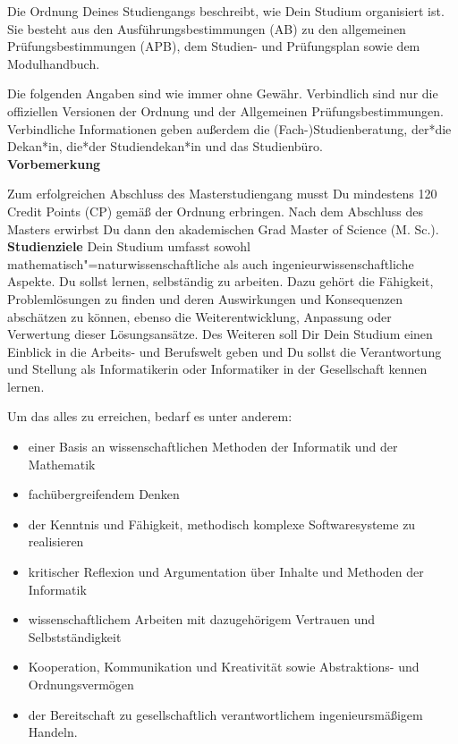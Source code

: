 {Die Ordnung Deines Studiengangs beschreibt, wie Dein Studium organisiert ist. Sie besteht aus den Ausführungsbestimmungen (AB) zu den allgemeinen Prüfungsbestimmungen (APB), dem Studien- und Prüfungsplan sowie dem Modulhandbuch.
}{
Die folgenden Angaben sind wie immer ohne Gewähr. Verbindlich sind nur die offiziellen Versionen der Ordnung und der Allgemeinen Prüfungsbestimmungen. Verbindliche Informationen geben außerdem die (Fach-)Studienberatung, der*die Dekan*in, die*der Studiendekan*in und das Studienbüro.\\

\noindent\textbf{Vorbemerkung}

Zum erfolgreichen Abschluss des Masterstudiengang musst Du mindestens 120 Credit Points (CP) gemäß der Ordnung erbringen. Nach dem Abschluss des Masters erwirbst Du dann den akademischen Grad Master of Science (M. Sc.).\\

\noindent\textbf{Studienziele}
Dein Studium umfasst sowohl mathematisch"=naturwissenschaftliche als auch ingenieurwissenschaftliche Aspekte. Du sollst lernen, selbständig zu arbeiten. Dazu gehört die Fähigkeit, Problemlösungen zu finden und deren Auswirkungen und Konsequenzen abschätzen zu können, ebenso die Weiterentwicklung, Anpassung oder Verwertung dieser Lösungsansätze. Des Weiteren soll Dir Dein Studium einen Einblick in die Arbeits- und Berufswelt geben und Du sollst die Verantwortung und Stellung als Informatikerin oder Informatiker in der Gesellschaft kennen lernen.

Um das alles zu erreichen, bedarf es unter anderem:
\begin{itemize}
\item einer Basis an wissenschaftlichen Methoden der Informatik und der Mathematik
\item fachübergreifendem Denken
\item der Kenntnis und Fähigkeit, methodisch komplexe Softwaresysteme zu realisieren
\item kritischer Reflexion und Argumentation über Inhalte und Methoden der Informatik
\item wissenschaftlichem Arbeiten mit dazugehörigem Vertrauen und Selbstständigkeit
\item Kooperation, Kommunikation und Kreativität sowie Abstraktions- und Ordnungsvermögen
\item der Bereitschaft zu gesellschaftlich verantwortlichem ingenieursmäßigem Handeln.
\end{itemize}

}
